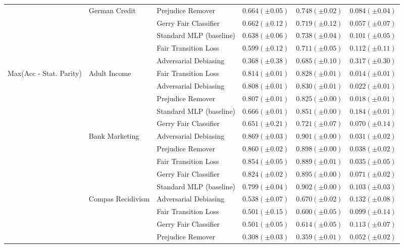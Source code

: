\begin{tabular}{llllll}
\cline{2-6}
 & \multirow[t]{5}{*}{German Credit} & Prejudice Remover & $0.664 (\pm0.05)$ & $0.748 (\pm0.02)$ & $0.084 (\pm0.04)$ \\
 &  & Gerry Fair Classifier & $0.662 (\pm0.12)$ & $0.719 (\pm0.12)$ & $0.057 (\pm0.07)$ \\
 &  & Standard MLP (baseline) & $0.638 (\pm0.06)$ & $0.738 (\pm0.04)$ & $0.101 (\pm0.05)$ \\
 &  & Fair Transition Loss & $0.599 (\pm0.12)$ & $0.711 (\pm0.05)$ & $0.112 (\pm0.11)$ \\
 &  & Adversarial Debiasing & $0.368 (\pm0.38)$ & $0.685 (\pm0.10)$ & $0.317 (\pm0.30)$ \\
\cline{1-6} \cline{2-6}
\multirow[t]{20}{*}{Max(Acc - Stat. Parity)} & \multirow[t]{5}{*}{Adult Income} & Fair Transition Loss & $0.814 (\pm0.01)$ & $0.828 (\pm0.01)$ & $0.014 (\pm0.01)$ \\
 &  & Adversarial Debiasing & $0.808 (\pm0.01)$ & $0.830 (\pm0.01)$ & $0.022 (\pm0.01)$ \\
 &  & Prejudice Remover & $0.807 (\pm0.01)$ & $0.825 (\pm0.00)$ & $0.018 (\pm0.01)$ \\
 &  & Standard MLP (baseline) & $0.666 (\pm0.01)$ & $0.851 (\pm0.00)$ & $0.184 (\pm0.01)$ \\
 &  & Gerry Fair Classifier & $0.651 (\pm0.21)$ & $0.721 (\pm0.07)$ & $0.070 (\pm0.14)$ \\
\cline{2-6}
 & \multirow[t]{5}{*}{Bank Marketing} & Adversarial Debiasing & $0.869 (\pm0.03)$ & $0.901 (\pm0.00)$ & $0.031 (\pm0.02)$ \\
 &  & Prejudice Remover & $0.860 (\pm0.02)$ & $0.898 (\pm0.00)$ & $0.038 (\pm0.02)$ \\
 &  & Fair Transition Loss & $0.854 (\pm0.05)$ & $0.889 (\pm0.01)$ & $0.035 (\pm0.05)$ \\
 &  & Gerry Fair Classifier & $0.824 (\pm0.02)$ & $0.895 (\pm0.00)$ & $0.071 (\pm0.02)$ \\
 &  & Standard MLP (baseline) & $0.799 (\pm0.04)$ & $0.902 (\pm0.00)$ & $0.103 (\pm0.03)$ \\
\cline{2-6}
 & \multirow[t]{5}{*}{Compas Recidivism} & Adversarial Debiasing & $0.538 (\pm0.07)$ & $0.670 (\pm0.02)$ & $0.132 (\pm0.08)$ \\
 &  & Fair Transition Loss & $0.501 (\pm0.15)$ & $0.600 (\pm0.05)$ & $0.099 (\pm0.14)$ \\
 &  & Gerry Fair Classifier & $0.501 (\pm0.05)$ & $0.614 (\pm0.05)$ & $0.113 (\pm0.07)$ \\
 &  & Prejudice Remover & $0.308 (\pm0.03)$ & $0.359 (\pm0.01)$ & $0.052 (\pm0.02)$ \\

\end{tabular}
